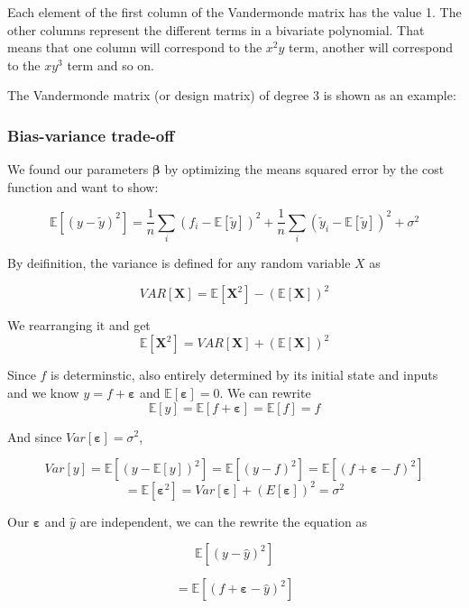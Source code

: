 \documentclass[a4paper]{article}
\begin{document}
Each element of the first column of the Vandermonde matrix has the value 1. The other columns represent the different terms in a bivariate polynomial. That means that one column will correspond to the $x^{2}y$ term, another will correspond to the $xy^{3}$ term and so on.

The Vandermonde matrix (or design matrix) of degree 3 is shown as an example:

\subsubsection{Bias-variance trade-off}

We found our parameters $\boldsymbol{\beta}$  by optimizing the means squared error by the cost function and want to show:

$$ \mathbb{E}\left[({y}-\tilde{y})^2\right] = \frac{1}{n}\sum_i(f_i-\mathbb{E}\left[{\tilde{y}}\right])^2+\frac{1}{n}\sum_i(\tilde{y}_i- \mathbb{E}\left[{\tilde{y}}\right])^2+\sigma^2$$

By deifinition, the variance is defined for any random variable $X$ as

$$ VAR[\mathbf{X}] = \mathbb{E}[\mathbf{X}^{2}] - (\mathbb{E}[\mathbf{X}])^{2} $$

We rearranging it and get
$$ \mathbb{E}[\mathbf{X}^{2}] = VAR[\mathbf{X}] + (\mathbb{E}[\mathbf{X}])^{2}  $$


Since $f$ is determinstic, also entirely determined by its initial state and inputs and we know $y = f + \boldsymbol{\varepsilon}$ and $\mathbb{E}[\boldsymbol{\varepsilon}] = 0$. We can rewrite 
$$\mathbb{E}[y] = \mathbb{E}[{f} + \boldsymbol{\varepsilon}] = \mathbb{E}[f] = f$$


And since $Var[\boldsymbol{\varepsilon}] = \sigma^2$,

$$ Var[y] = \mathbb{E}[(y - \mathbb{E}[y])^{2}] = \mathbb{E}[(y-f)^{2}]= \mathbb{E}[(f + \boldsymbol{\varepsilon} - f)^{2}]$$
$$= \mathbb{E}[\boldsymbol{\varepsilon}^{2}] = Var[\boldsymbol{\varepsilon}] + (E[\boldsymbol{\varepsilon}])^{2} = \sigma^{2}$$



Our $\boldsymbol{\varepsilon}$ and $\hat{y}$ are independent, we can the rewrite the equation as


$$ \mathbb{E}[(y - \hat{y})^{2}] $$

$$ = \mathbb{E}[(f + \boldsymbol{\varepsilon} - \hat{y})^{2}]$$
\end{document}
